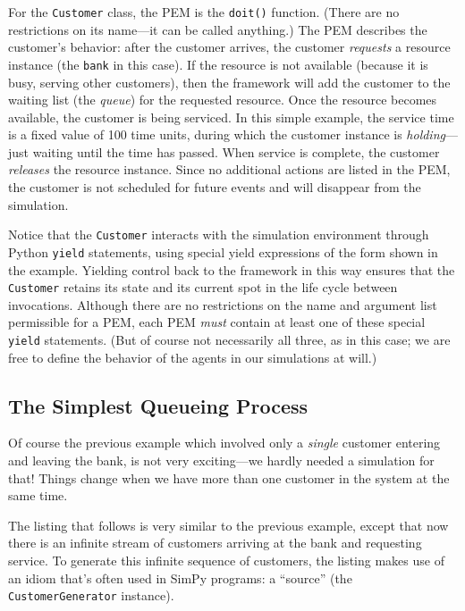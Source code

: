 For the \texttt{Customer} class, the PEM is the \texttt{doit()}
function. (There are no restrictions on its name---it can be called
anything.)  The PEM describes the customer's behavior: after the
customer arrives, the customer \emph{requests} a resource instance
(the \texttt{bank} in this case). If the resource is not available
(because it is busy, serving other customers), then the framework will
add the customer to the waiting list (the \emph{queue}) for the
requested resource. Once the resource becomes available, the customer
is being serviced. In this simple example, the service time is a fixed
value of 100 time units, during which the customer instance is
\emph{holding}---just waiting until the time has passed. When service
is complete, the customer \emph{releases} the resource instance. Since
no additional actions are listed in the PEM, the customer is not
scheduled for future events and will disappear from the simulation.

Notice that the \texttt{Customer} interacts with the simulation
environment through Python \texttt{yield} statements, using special
yield expressions of the form shown in the example.  Yielding control
back to the framework in this way ensures that the \texttt{Customer}
retains its state and its current spot in the life cycle between
invocations.  Although there are no restrictions on the name and
argument list permissible for a PEM, each PEM \emph{must} contain at
least one of these special \texttt{yield} statements. (But of course
not necessarily all three, as in this case; we are free to define the
behavior of the agents in our simulations at will.)



\subsection{The Simplest Queueing Process}


Of course the previous example which involved only a \emph{single}
customer entering and leaving the bank, is not very exciting---we
hardly needed a simulation for that! Things change when we have more
than one customer in the system at the same time.

The listing that follows is very similar to the previous example,
except that now there is an infinite stream of customers arriving at
the bank and requesting service. To generate this infinite sequence of
customers, the listing makes use of an idiom that's often used in
SimPy programs: a ``source'' (the \texttt{CustomerGenerator}
instance).

